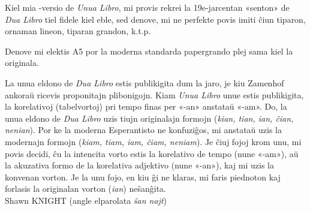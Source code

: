 \documentclass[ngerman,12pt,twoside]{book}
\begin{document}
\sloppy

%
%


%
%


%
%


%
%


%
%


%
%


%
%
\kolofono

\small Kiel mia \XeLaTeX{}-versio de \emph{Unua Libro}, mi provis rekrei la 19e-jarcentan «senton» de \emph{Dua Libro} tiel fidele kiel eble, sed denove, mi ne perfekte povis imiti ĉiun tiparon, ornaman lineon, tiparan grandon, k.t.p.

Denove mi elektis A5 por la moderna standarda papergrando plej sama kiel la originala.

La unua eldono de \emph{Dua Libro} estis publikigita dum la jaro, je kiu Zamenhof ankoraŭ ricevis proponitajn plibonigojn.  Kiam \emph{Unua Libro} unue estis publikigita, la korelativoj (tabelvortoj) pri tempo finas per «-an» anstataŭ «-am».  Do, la unua eldono de \emph{Dua Libro} uzis tiujn originalajn formojn (\emph{kian, tian, ian, ĉian, nenian}).  Por ke la moderna Esperantisto ne konfuziĝos, mi anstataŭ uzis la modernajn formojn (\emph{kiam, tiam, iam, ĉiam, neniam}).  Je ĉiuj fojoj krom unu, mi povis decidi, ĉu la intencita vorto estis la korelativo de tempo (nune «-am»), aŭ la akuzativa formo de la korelativa adjektivo (nune «-an»), kaj mi uzis la konvenan vorton.  Je la unu fojo, en kiu ĝi ne klaras, mi faris piednoton kaj forlasis la originalan vorton (\emph{ian}) neŝanĝita.\\[1ex] 

{\setlength{\parindent}{0em}
Shawn KNIGHT (angle elparolata \emph{ŝan najt})\\
\hodiau}


\end{document}
